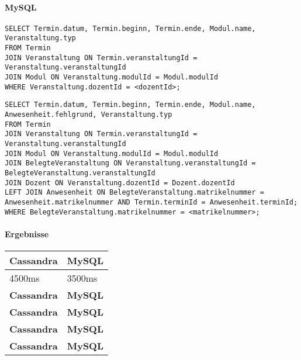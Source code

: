 \paragraph{MySQL}
\begin{lstlisting}
SELECT Termin.datum, Termin.beginn, Termin.ende, Modul.name, Veranstaltung.typ
FROM Termin
JOIN Veranstaltung ON Termin.veranstaltungId = Veranstaltung.veranstaltungId
JOIN Modul ON Veranstaltung.modulId = Modul.modulId
WHERE Veranstaltung.dozentId = <dozentId>;
\end{lstlisting} 
\begin{lstlisting}
SELECT Termin.datum, Termin.beginn, Termin.ende, Modul.name, Anwesenheit.fehlgrund, Veranstaltung.typ
FROM Termin
JOIN Veranstaltung ON Termin.veranstaltungId = Veranstaltung.veranstaltungId
JOIN Modul ON Veranstaltung.modulId = Modul.modulId
JOIN BelegteVeranstaltung ON Veranstaltung.veranstaltungId = BelegteVeranstaltung.veranstaltungId
JOIN Dozent ON Veranstaltung.dozentId = Dozent.dozentId
LEFT JOIN Anwesenheit ON BelegteVeranstaltung.matrikelnummer = Anwesenheit.matrikelnummer AND Termin.terminId = Anwesenheit.terminId;
WHERE BelegteVeranstaltung.matrikelnummer = <matrikelnummer>; 
\end{lstlisting} 

\vspace{6pt}

\paragraph{Ergebnisse}
\begin{tabular}{|p{5cm}|p{5cm}|}
	\hline
	\textbf{Cassandra} & \textbf{MySQL}\\
	\hline
	4500ms & 3500ms\\
	\hline
	\textbf{Cassandra} & \textbf{MySQL}\\
	\hline
	\textbf{Cassandra} & \textbf{MySQL}\\
	\hline
	\textbf{Cassandra} & \textbf{MySQL}\\
	\hline
	\textbf{Cassandra} & \textbf{MySQL}\\
	\hline
\end{tabular}
